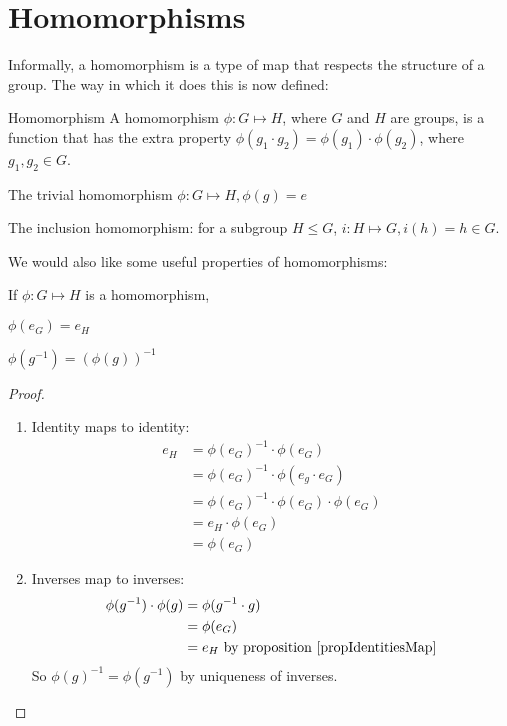 \documentclass[../Main.tex]{subfiles}
\begin{document}
\section{Homomorphisms}
Informally, a homomorphism is a type of map that respects the structure of a group. The way in which it does this is now defined:
\begin{definition}{Homomorphism}
    A homomorphism $\phi : G \mapsto H$, where $G$ and $H$ are groups, is a function that has the extra property $\phi(g_1 \cdot g_2) = \phi(g_1) \cdot \phi(g_2)$, where $g_1, g_2 \in G$.
\end{definition}
\begin{examples}{}
    \item The trivial homomorphism $\phi : G \mapsto H, \phi(g) = e$
    \item The inclusion homomorphism: for a subgroup $H \leq G$, $i : H \mapsto G, i(h) = h \in G$.
\end{examples}
We would also like some useful properties of homomorphisms:
\begin{propositions}{
        \label{propHismFundamentals}
        If $\phi : G \mapsto H$ is a homomorphism,
    }
    \item $\phi(e_G) = e_H$ \label{propIdentitiesMap}
    \item $\phi(g^{-1}) = (\phi(g))^{-1}$ \label{propInversesmap}
\end{propositions}
\begin{proof}
    \begin{enumerate}
        \item Identity maps to identity:
        \begin{align*}
            e_H &= \phi(e_G)^{-1} \cdot \phi(e_G) \\
            &= \phi(e_G)^{-1} \cdot \phi(e_g \cdot e_G) \\
            &= \phi(e_G)^{-1} \cdot \phi(e_G) \cdot \phi(e_G) \\
            &= e_H \cdot \phi(e_G) \\
            &= \phi(e_G)
        \end{align*}
        \item Inverses map to inverses:
        \begin{align*}
            \phi(g^{-1}) \cdot \phi(g) &= \phi(g^{-1} \cdot g) \\
            &= \phi(e_G) \\
            &= e_H \text{ by proposition~\ref{propIdentitiesMap}}
        \end{align*}
        So $\phi(g)^{-1} = \phi(g^{-1})$ by uniqueness of inverses.
    \end{enumerate}
\end{proof}
\end{document}
